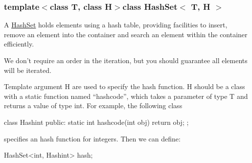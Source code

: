 \subsubsection*{template$<$class T, class H$>$class HashSet$<$ T, H $>$}

A \hyperlink{class_hash_set}{HashSet} holds elements using a hash table, providing facilities to insert, remove an element into the container and search an element within the container efficiently.

We don't require an order in the iteration, but you should guarantee all elements will be iterated.

Template argument H are used to specify the hash function. H should be a class with a static function named ``hashcode'', which takes a parameter of type T and returns a value of type int. For example, the following class 
\begin{DoxyCode}
      class Hashint {
      public:
          static int hashcode(int obj) {
              return obj;
          }
      };
\end{DoxyCode}
 specifies an hash function for integers. Then we can define: 
\begin{DoxyCode}
      HashSet<int, Hashint> hash;
\end{DoxyCode}
 

